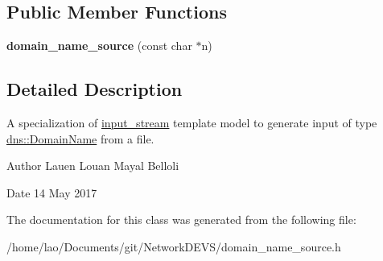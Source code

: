 \subsection*{Public Member Functions}
\begin{DoxyCompactItemize}
\item 
{\bfseries domain\+\_\+name\+\_\+source} (const char $\ast$n)\hypertarget{classdomain__name__source_a76cb055b27491617cad5842617bfe299}{}\label{classdomain__name__source_a76cb055b27491617cad5842617bfe299}

\end{DoxyCompactItemize}


\subsection{Detailed Description}
A specialization of \hyperlink{classinput__stream}{input\+\_\+stream} template model to generate input of type \hyperlink{structdns_1_1DomainName}{dns\+::\+Domain\+Name} from a file. 

\begin{DoxyAuthor}{Author}
Lauen Louan Mayal Belloli 
\end{DoxyAuthor}
\begin{DoxyDate}{Date}
14 May 2017 
\end{DoxyDate}


The documentation for this class was generated from the following file\+:\begin{DoxyCompactItemize}
\item 
/home/lao/\+Documents/git/\+Network\+D\+E\+V\+S/domain\+\_\+name\+\_\+source.\+h\end{DoxyCompactItemize}
